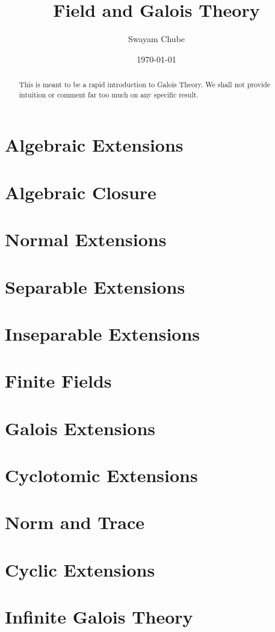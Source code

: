 \documentclass{report}
\title{Field and Galois Theory}
\author{Swayam Chube}
\date{\today}
\begin{document}
\maketitle

\begin{abstract}
    This is meant to be a rapid introduction to Galois Theory. We shall not provide intuition or comment far too much on any specific result.
\end{abstract}

\tableofcontents

\chapter{Algebraic Extensions}
 

\chapter{Algebraic Closure}


\chapter{Normal Extensions}


\chapter{Separable Extensions}


\chapter{Inseparable Extensions}


\chapter{Finite Fields}


\chapter{Galois Extensions}


\chapter{Cyclotomic Extensions}


\chapter{Norm and Trace}


\chapter{Cyclic Extensions}


\chapter{Infinite Galois Theory}




\end{document}
